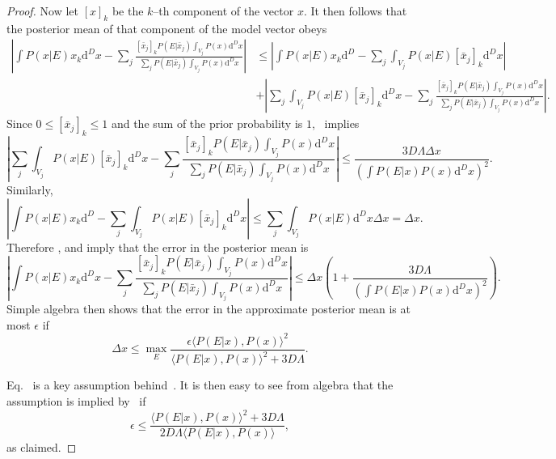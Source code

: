 \documentclass[aps,amsmath,onecolumn,amssymb,notitlepage]{revtex4-1}
\begin{document}
\begin{proof}
Now let $[x]_k$ be the $k$--th component of the vector $x$.  It then follows that the posterior mean of that component of the model vector obeys
\begin{align}
\left|\int P(x|E) x_k \mathrm{d}^D x- \sum_j  \frac{[\bar{x}_j]_k P(E|\bar{x}_j)\int_{V_j} P(x) \mathrm{d}^D x}{\sum_jP(E|\bar{x}_j)\int_{V_j} P(x) \mathrm{d}^D x}\right| &\le \left|\int P(x|E) x_k \mathrm{d}^D -\sum_j \int_{V_j} P(x|E)[\bar{x}_j]_k \mathrm{d}^D x \right|\nonumber\\
& + \left|\sum_j \int_{V_j} P(x|E)[\bar{x}_j]_k \mathrm{d}^D x- \sum_j  \frac{[\bar{x}_j]_k P(E|\bar{x}_j)\int_{V_j} P(x) \mathrm{d}^D x}{\sum_jP(E|\bar{x}_j)\int_{V_j} P(x) \mathrm{d}^D x} \right|.\label{eq:meantriangle}
\end{align}
Since $0\le [\bar{x}_j]_k \le 1$ and the sum of the prior probability is $1$,~ implies
\begin{equation}
\left|\sum_j \int_{V_j} P(x|E)[\bar{x}_j]_k \mathrm{d}^D x- \sum_j  \frac{[\bar{x}_j]_k P(E|\bar{x}_j)\int_{V_j} P(x) \mathrm{d}^D x}{\sum_jP(E|\bar{x}_j)\int_{V_j} P(x) \mathrm{d}^D x} \right| \le  \frac{3D\Lambda\Delta x}{\left(\int P(E|x) P(x) \mathrm{d}^D x\right)^2}.\label{eq:meantriangle1}
\end{equation}
Similarly,
\begin{equation}
\left|\int P(x|E) x_k \mathrm{d}^D -\sum_j \int_{V_j} P(x|E)[\bar{x}_j]_k \mathrm{d}^D x \right|\le \sum_j \int_{V_j} P(x|E) \mathrm{d}^D x \Delta x = \Delta x.\label{eq:meantriangle2}
\end{equation}
Therefore ,  and  imply that the error in the posterior mean is
\begin{equation}
\left|\int P(x|E) x_k \mathrm{d}^D x- \sum_j  \frac{[\bar{x}_j]_k P(E|\bar{x}_j)\int_{V_j} P(x) \mathrm{d}^D x}{\sum_jP(E|\bar{x}_j)\int_{V_j} P(x) \mathrm{d}^D x}\right| \le \Delta x\left(1+\frac{3D\Lambda}{\left(\int P(E|x) P(x) \mathrm{d}^D x\right)^2} \right).\label{eq:meanbound}
\end{equation}
Simple algebra then shows that the error in the approximate posterior mean is at most $\epsilon$ if
\begin{equation}
\Delta x \le \max_E \frac{\epsilon \langle P(E|x),P(x)\rangle^2}{\langle P(E|x),P(x)\rangle^2+3{D} \Lambda}.\label{eq:Deltaxbd}
\end{equation}

Eq.~ is a key assumption behind~.  It is then easy to see from algebra that the assumption is implied by~ if
\begin{equation}
\epsilon \le \frac{\langle P(E|x),P(x)\rangle^2+ 3D\Lambda}{2 D\Lambda\langle P(E|x),P(x)\rangle},
\end{equation}
as claimed.
\end{proof}
\end{document}

